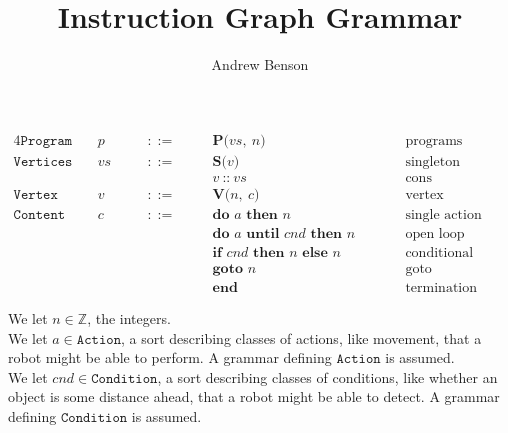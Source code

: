\documentclass[12pt]{article}
\title{Instruction Graph Grammar}
\author{Andrew Benson}
\date{}
\newcommand{\sort}[1]{\mathtt{#1}}
\newcommand{\syn}[1]{\textbf{#1}}
\newcommand{\nterm}[1]{\mathit{#1}}
\newcommand{\prog}[2]{\syn{P(}#1,\ #2\syn{)}}
\newcommand{\sing}[1]{\syn{S(}#1\syn{)}}
\newcommand{\cons}[2]{#1\ \syn{::}\ #2}
\newcommand{\ver}[2]{\syn{V(}#1,\ #2\syn{)}}
\newcommand{\doonce}[2]{\syn{do }#1\syn{ then }#2}
\newcommand{\dountil}[3]{\syn{do }#1\syn{ until }#2\syn{ then }#3}
\newcommand{\ifelse}[3]{\syn{if }#1\syn{ then }#2\syn{ else }#3}
\newcommand{\goto}[1]{\syn{goto }#1}
\newcommand{\progend}[0]{\syn{end}}
\begin{document}
\maketitle

\begin{alignat*}{4}
  \sort{Program}\quad
    &\nterm{p}\quad & &::=\quad &
      &\prog{\nterm{vs}}{\nterm{n}}\qquad & &\text{programs}\\
  \sort{Vertices}\quad
    &\nterm{vs}\quad & &::=\quad &
      &\sing{\nterm{v}}\qquad & &\text{singleton}\\
  &&&&&\cons{\nterm{v}}{\nterm{vs}}\qquad & &\text{cons}\\
  \sort{Vertex}\quad
    &\nterm{v}\quad & &::=\quad &
      &\ver{\nterm{n}}{\nterm{c}}\qquad & &\text{vertex}\\
  \sort{Content}\quad
    &\nterm{c}\quad & &::=\quad &
      &\doonce{\nterm{a}}{\nterm{n}}\qquad & &\text{single action}\\
  &&&&&\dountil{\nterm{a}}{\nterm{cnd}}{\nterm{n}}\qquad & &\text{open loop action}\\
  &&&&&\ifelse{\nterm{cnd}}{\nterm{n}}{\nterm{n}}\qquad & & \text{conditional}\\
  &&&&&\goto{\nterm{n}}\qquad & &\text{goto}\\
  &&&&&\progend\qquad & &\text{termination}
\end{alignat*}

We let $\nterm{n} \in \mathbb{Z}$, the integers.\\

We let $\nterm{a} \in \sort{Action}$, a sort describing classes of actions,
like movement, that a robot might be able to perform. A grammar defining
$\sort{Action}$ is assumed.\\

We let $\nterm{cnd} \in \sort{Condition}$, a sort describing classes of
conditions, like whether an object is some distance ahead, that a robot might be
able to detect. A grammar defining $\sort{Condition}$ is assumed.\\
\end{document}
